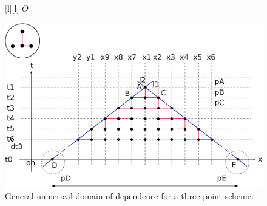 \begin{figure}[ht]
	[l] {$O$}

	\includegraphics[width=1.0\textwidth]{DomainOfDependence3pts.eps}
	\caption{General numerical domain of dependence for a three-point scheme.}
	\label{\LABEL}
\end{figure}
